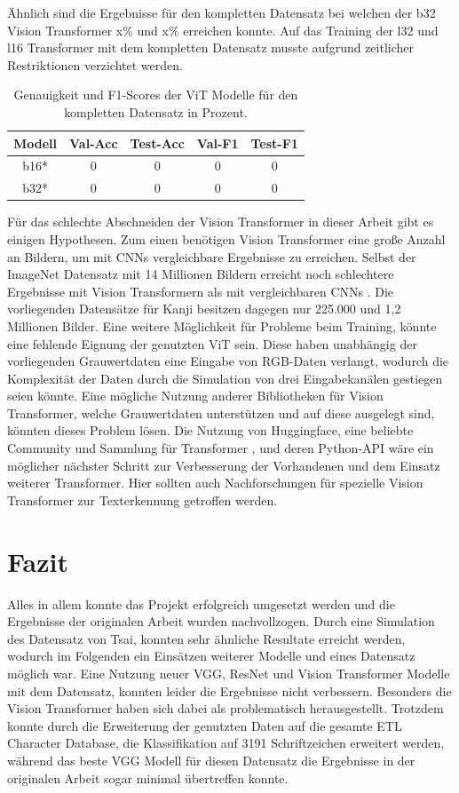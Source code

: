 \documentclass[twoside,a4paper]{IEEEtran}
\begin{document}
Ähnlich sind die Ergebnisse für den kompletten Datensatz bei welchen der b32 Vision Transformer x\% und x\% erreichen konnte. Auf das Training der l32 und l16 Transformer mit dem kompletten Datensatz musste aufgrund zeitlicher Restriktionen verzichtet werden.
\begin{table}[!htb]
	\caption{Genauigkeit und F1-Scores der ViT Modelle für den kompletten Datensatz in Prozent.}
	\label{vit_ergebnis_full}
	\centering
	\begin{tabular}{|c|c|c|c|c|}
		\hline
		Modell & Val-Acc & Test-Acc & Val-F1 & Test-F1\\
		\hline
		\hline 
		b16* & 0 & 0 & 0 & 0\\
		\hline
		b32* & 0 & 0 & 0 & 0\\
		\hline 
	\end{tabular}
\end{table}

Für das schlechte Abschneiden der Vision Transformer in dieser Arbeit gibt es einigen Hypothesen. Zum einen benötigen Vision Transformer eine große Anzahl an Bildern, um mit CNNs vergleichbare Ergebnisse zu erreichen. Selbst der ImageNet Datensatz mit 14 Millionen Bildern \cite{IMAGENET} erreicht noch schlechtere Ergebnisse mit Vision Transformern als mit vergleichbaren CNNs \cite{JFT}. Die vorliegenden Datensätze für Kanji besitzen dagegen nur 225.000 und 1,2 Millionen Bilder. Eine weitere Möglichkeit für Probleme beim Training, könnte eine fehlende Eignung der genutzten ViT sein. Diese haben unabhängig der vorliegenden Grauwertdaten eine Eingabe von RGB-Daten verlangt, wodurch die Komplexität der Daten durch die Simulation von drei Eingabekanälen gestiegen seien könnte. Eine mögliche Nutzung anderer Bibliotheken für Vision Transformer, welche Grauwertdaten unterstützen und auf diese ausgelegt sind, könnten dieses Problem lösen. Die Nutzung von Huggingface, eine beliebte Community und Sammlung für Transformer \cite{huggingface}, und deren Python-API wäre ein möglicher nächster Schritt zur Verbesserung der Vorhandenen und dem Einsatz weiterer Transformer. Hier sollten auch Nachforschungen für spezielle Vision Transformer zur Texterkennung getroffen werden. 

\section{Fazit} %
Alles in allem konnte das Projekt erfolgreich umgesetzt werden und die Ergebnisse der originalen Arbeit wurden nachvollzogen. Durch eine Simulation des Datensatz von Tsai, konnten sehr ähnliche Resultate erreicht werden, wodurch im Folgenden ein Einsätzen weiterer Modelle und eines Datensatz möglich war. Eine Nutzung neuer VGG, ResNet und Vision Transformer Modelle mit dem Datensatz, konnten leider die Ergebnisse nicht verbessern. Besonders die Vision Transformer haben sich dabei als problematisch herausgestellt. Trotzdem konnte durch die Erweiterung der genutzten Daten auf die gesamte ETL Character Database, die Klassifikation auf 3191 Schriftzeichen erweitert werden, während das beste VGG Modell für diesen Datensatz die Ergebnisse in der originalen Arbeit sogar minimal übertreffen konnte.
\end{document}
